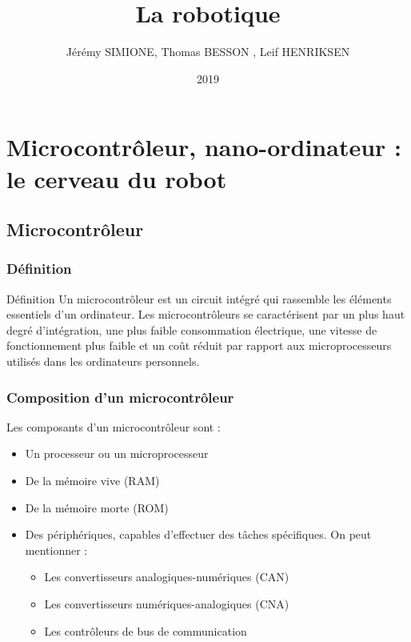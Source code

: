 \documentclass{beamer}
\title{La robotique}
\author{Jérémy SIMIONE, Thomas BESSON , Leif HENRIKSEN}
\institute{Université de Montpellier}
\date{2019}
\begin{document}
\begin{frame}
  \titlepage
\end{frame}


\section{Microcontrôleur, nano-ordinateur : le cerveau du robot}
\subsection{ Microcontrôleur}
\begin{frame}
\frametitle{Définition}
\begin{block}{Définition}
Un microcontrôleur est un circuit intégré qui rassemble les éléments essentiels d'un ordinateur.
 Les microcontrôleurs se caractérisent par un plus haut degré d'intégration, une plus faible consommation électrique,
 une vitesse de fonctionnement plus faible  et un coût réduit par rapport aux microprocesseurs  utilisés dans les ordinateurs personnels. 
\end{block}
\end{frame}
\begin{frame}
\frametitle{Composition d'un microcontrôleur}
  Les composants d'un microcontrôleur sont :
  \begin{itemize}
      \item Un processeur ou un microprocesseur 
      \item De la mémoire vive (RAM) 
      \item De la mémoire morte (ROM) 	
      \item Des périphériques, capables d'effectuer des tâches spécifiques. On peut mentionner  :
		\begin{itemize}
   			\item Les convertisseurs analogiques-numériques (CAN) 
 			  \item Les convertisseurs numériques-analogiques (CNA) 
 			  \item Les contrôleurs de bus de communication
		\end{itemize} 
  \end{itemize}
\end{frame}
\end{document}
